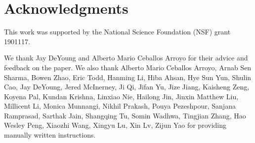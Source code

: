 \section{Acknowledgments}

This work was supported by the National Science Foundation (NSF) grant 1901117.

We thank Jay DeYoung and Alberto Mario Ceballos Arroyo for their advice and feedback on the paper. 
We also thank Alberto Mario Ceballos Arroyo, Arnab Sen Sharma, Bowen Zhao, Eric Todd, Hanming Li, Hiba Ahsan, Hye Sun Yun, Shulin Cao, Jay DeYoung, Jered McInerney, Ji Qi, Jifan Yu, Jize Jiang, Kaisheng Zeng, Koyena Pal, Kundan Krishna, Linxiao Nie, Hailong Jin, Jinxin Matthew Liu, Millicent Li, Monica Munnangi, Nikhil Prakash, Pouya Pezeshpour, Sanjana Ramprasad, Sarthak Jain, Shangqing Tu, Somin Wadhwa, Tingjian Zhang, Hao Wesley Peng, Xiaozhi Wang, Xingyu Lu, Xin Lv, Zijun Yao for providing manually written instructions.



